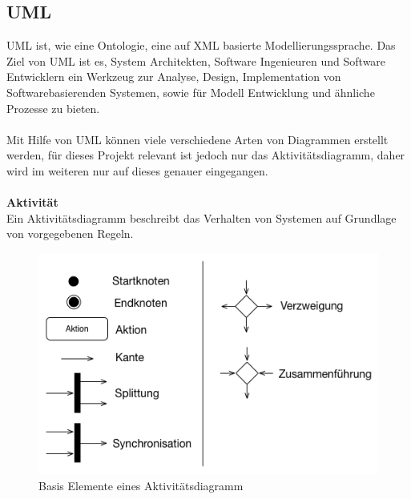 \subsection{UML}
UML ist, wie eine Ontologie, eine auf XML basierte Modellierungssprache.
Das Ziel von UML ist es, System Architekten, Software Ingenieuren und Software Entwicklern ein Werkzeug zur Analyse, Design, Implementation von Softwarebasierenden Systemen, sowie für Modell Entwicklung und ähnliche Prozesse zu bieten.\\
\\
Mit Hilfe von UML können viele verschiedene Arten von Diagrammen erstellt werden, für dieses Projekt relevant ist jedoch nur das Aktivitätsdiagramm, daher wird im weiteren nur auf dieses genauer eingegangen.\\
\\
\textbf{Aktivität}\\
Ein Aktivitätsdiagramm beschreibt das Verhalten von Systemen auf Grundlage von vorgegebenen Regeln. \\

\begin{figure}[hbt!]
 \centering
  \includegraphics[width=1\textwidth]{graphics/stateoftheart/Activity_Elemente}
  \caption{Basis Elemente eines Aktivitätsdiagramm \cite{activity_list}}
\end{figure}

